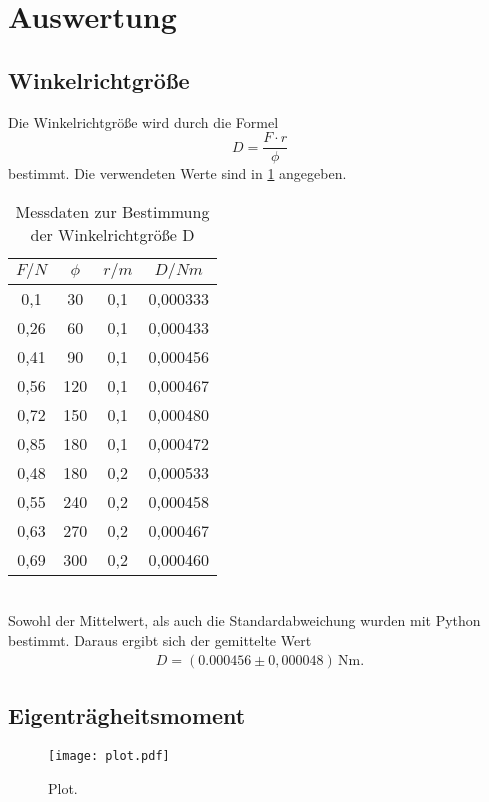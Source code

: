 \section{Auswertung}
\label{sec:Auswertung}
\subsection{Winkelrichtgröße}
Die Winkelrichtgröße wird durch die Formel
\begin{equation}
  D = \frac{F \cdot r}{\phi}
\end{equation}
bestimmt. Die verwendeten Werte sind in \ref{tab:winkelrichtgr} angegeben.
\begin{table}
  \centering
  \label{tab:winkelrichtgr}
  \caption{Messdaten zur Bestimmung der Winkelrichtgröße D}
  \begin{tabular}{c c c c}
    \toprule
    $F/N$ & $\phi$ & $r/m$ & $D/Nm$ \\
    \midrule
    0,1  &  30 & 0,1 & 0,000333\\
    0,26 &  60 & 0,1 & 0,000433\\
    0,41 &  90 & 0,1 & 0,000456\\
    0,56 & 120 & 0,1 & 0,000467\\
    0,72 & 150 & 0,1 & 0,000480\\
    0,85 & 180 & 0,1 & 0,000472\\
    0,48 & 180 & 0,2 & 0,000533\\
    0,55 & 240 & 0,2 & 0,000458\\
    0,63 & 270 & 0,2 & 0,000467\\
    0,69 & 300 & 0,2 & 0,000460\\
    \bottomrule
  \end{tabular}
\end{table}
\\Sowohl der Mittelwert, als auch die Standardabweichung wurden mit Python bestimmt. Daraus ergibt sich der
gemittelte Wert
\begin{align*}
    D = (0.000456 \pm 0{,}000048)\,\mathrm{Nm} .
\end{align*}

\subsection{Eigenträgheitsmoment}
\begin{figure}
  \centering
  \texttt{[image: plot.pdf]}
  \caption{Plot.}
  \label{fig:plot}
\end{figure}

